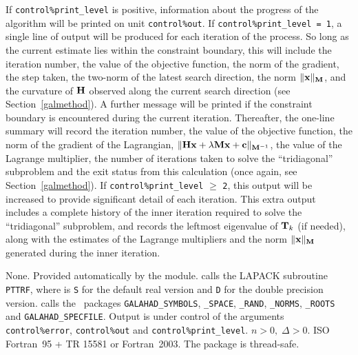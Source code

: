\documentclass{galahad}
\newcommand{\packagename}{GL\-TR}
\begin{document}

\galinfo
If {\tt control\%print\_level} is positive, information about the progress
of the algorithm will be printed on unit {\tt control\-\%\-out}.
If {\tt control\%print\_level = 1}, a single line of output will be produced
for each iteration of the process. So long as the current estimate lies
within the constraint boundary, this will include
the iteration number, the value of the objective function, the
norm of the gradient, the step taken, the two-norm of the latest search
direction, the norm $\|{\mathbf{x}}\|_{{\mathbf{M}}}$, and the curvature of ${\mathbf{H}}$ observed
along the current search direction (see Section~\ref{galmethod}).
A further message will be printed
if the constraint boundary is encountered during the current iteration.
Thereafter, the one-line summary will record
the iteration number, the value of the objective function, the
norm of the gradient of the Lagrangian,
$\|{\mathbf{H}} {\mathbf{x}}  +  \lambda {\mathbf{M}} {\mathbf{x}}  +  {\mathbf{c}}\|_{{\mathbf{M}}^{-1}}$,
the value of the Lagrange multiplier, the
number of iterations taken to solve the ``tridiagonal'' subproblem
and the exit status from this calculation (once again, see
Section~\ref{galmethod}).
If {\tt control\%print\_level} $\geq$ {\tt 2}, this
output will be increased to provide significant detail of each iteration.
This extra output includes a complete history of the inner iteration required
to solve the ``tridiagonal'' subproblem, and records the leftmost eigenvalue
of ${\mathbf{T}}_k$ (if needed), along with the estimates of the Lagrange
multipliers and the norm $\|{\mathbf{x}}\|_{{\mathbf{M}}}$
generated during the inner iteration.


\galgeneral

\galcommon None.
\galworkspace Provided automatically by the module.
\galroutines {\tt \packagename\_solve} calls the LAPACK subroutine
{\tt *PTTRF}, where {\tt *} is {\tt S} for
the default real version and {\tt D} for the double precision version.
\galmodules {\tt \packagename\_solve} calls the \galahad\ packages
{\tt GALAHAD\_SY\-M\-BOLS},
{\tt \libraryname\_\-SPACE},
{\tt \libraryname\-\_\-RAND},
{\tt \libraryname\_\-NORMS},
{\tt \libraryname\_\-ROOTS} and
{\tt GALAHAD\_SPECFILE}.
\galio Output is under control of the arguments
{\tt control\%error}, {\tt control\%out} and {\tt control\%print\_level}.
\galrestrictions $n  >  0, \;  \Delta  >  0$.
\galportability ISO Fortran~95 + TR 15581 or Fortran~2003.
The package is thread-safe.
\end{document}
